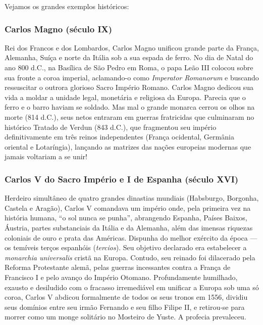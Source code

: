 \documentclass[11pt,a4paper,openany]{book}
\begin{document}
Vejamos os grandes exemplos históricos:

\subsubsection*{Carlos Magno (século IX)}
Rei dos Francos e dos Lombardos, Carlos Magno unificou grande parte da França, Alemanha, Suíça e norte da Itália sob a sua espada de ferro. No dia de Natal do ano 800 d.C., na Basílica de São Pedro em Roma, o papa Leão III colocou sobre sua fronte a coroa imperial, aclamando-o como \textit{Imperator Romanorum} e buscando ressuscitar o outrora glorioso Sacro Império Romano. Carlos Magno dedicou sua vida a moldar a unidade legal, monetária e religiosa da Europa. Parecia que o ferro e o barro haviam se soldado. Mas mal o grande monarca cerrou os olhos na morte (814 d.C.), seus netos entraram em guerras fratricidas que culminaram no histórico Tratado de Verdun (843 d.C.), que fragmentou seu império definitivamente em três reinos independentes (França ocidental, Germânia oriental e Lotaríngia), lançando as matrizes das nações europeias modernas que jamais voltariam a se unir!


\subsubsection*{Carlos V do Sacro Império e I de Espanha (século XVI)}
Herdeiro simultâneo de quatro grandes dinastias mundiais (Habsburgo, Borgonha, Castela e Aragão), Carlos V comandava um império onde, pela primeira vez na história humana, ``o sol nunca se punha'', abrangendo Espanha, Países Baixos, Áustria, partes substanciais da Itália e da Alemanha, além das imensas riquezas coloniais de ouro e prata das Américas. Dispunha do melhor exército da época — os temíveis terços espanhóis (\textit{tercios}). Seu objetivo declarado era estabelecer a \textit{monarchia universalis} cristã na Europa. Contudo, seu reinado foi dilacerado pela Reforma Protestante alemã, pelas guerras incessantes contra a França de Francisco I e pelo avanço do Império Otomano. Profundamente humilhado, exausto e desiludido com o fracasso irremediável em unificar a Europa sob uma só coroa, Carlos V abdicou formalmente de todos os seus tronos em 1556, dividiu seus domínios entre seu irmão Fernando e seu filho Filipe II, e retirou-se para morrer como um monge solitário no Mosteiro de Yuste. A profecia prevaleceu.
\end{document}
